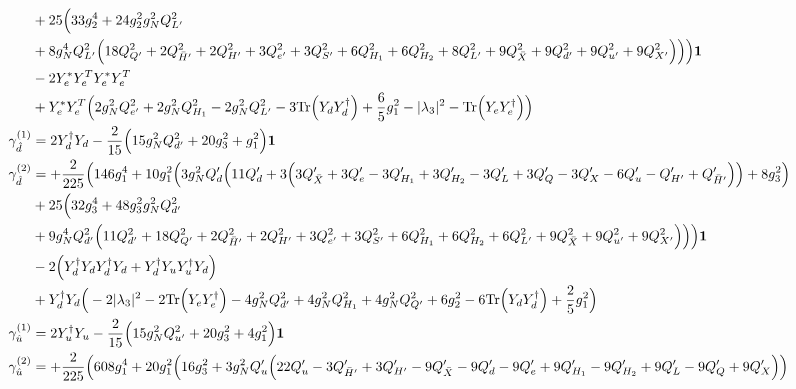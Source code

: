 {\begin{align}
 &+25 \Big(33 g_{2}^{4} +24 g_{2}^{2} g_{N}^{2} Q_{L'}^{2} \nonumber \\ 
 &+8 g_{N}^{4} Q_{L'}^{2} \Big(18 Q_{Q'}^{2}  + 2 Q_{\bar{H}'}^{2}  + 2 Q_{H'}^{2}  + 3 Q_{e'}^{2}  + 3 Q_{S'}^{2}  + 6 Q_{H_1}^{2}  + 6 Q_{H_2}^{2}  + 8 Q_{L'}^{2}  + 9 Q_{\bar{X}}^{2}  + 9 Q_{d'}^{2}  + 9 Q_{u'}^{2}  + 9 Q_{X'}^{2} \Big)\Big)\Big){\bf 1} \nonumber \\ 
 &-2 {Y_e^*  Y_{e}^{T}  Y_e^*  Y_{e}^{T}} \nonumber \\ 
 &+{Y_e^*  Y_{e}^{T}} \Big(2 g_{N}^{2} Q_{e'}^{2}  + 2 g_{N}^{2} Q_{H_1}^{2}  -2 g_{N}^{2} Q_{L'}^{2}  -3 \mbox{Tr}\Big({Y_d  Y_{d}^{\dagger}}\Big)  + \frac{6}{5} g_{1}^{2}  - |\lambda_3|^2  - \mbox{Tr}\Big({Y_e  Y_{e}^{\dagger}}\Big) \Big)\\ 
\gamma_{\hat{d}}^{(1)} & =  
2 {Y_{d}^{\dagger}  Y_d}  -\frac{2}{15} \Big(15 g_{N}^{2} Q_{d'}^{2}  + 20 g_{3}^{2}  + g_{1}^{2}\Big){\bf 1} \\ 
\gamma_{\hat{d}}^{(2)} & =  
+\frac{2}{225} \Big(146 g_{1}^{4} +10 g_{1}^{2} \Big(3 g_{N}^{2} Q_d' \Big(11 Q_d'  + 3 \Big(3 Q_{\bar{X}}'  + 3 Q_e'  -3 Q_{H_1}'  + 3 Q_{H_2}'  -3 Q_L'  + 3 Q_Q'  -3 Q_X'  -6 Q_u'  - Q_{H'}'  + Q_{\bar{H}'}'\Big)\Big) + 8 g_{3}^{2} \Big)\nonumber \\ 
 &+25 \Big(32 g_{3}^{4} +48 g_{3}^{2} g_{N}^{2} Q_{d'}^{2} \nonumber \\ 
 &+9 g_{N}^{4} Q_{d'}^{2} \Big(11 Q_{d'}^{2}  + 18 Q_{Q'}^{2}  + 2 Q_{\bar{H}'}^{2}  + 2 Q_{H'}^{2}  + 3 Q_{e'}^{2}  + 3 Q_{S'}^{2}  + 6 Q_{H_1}^{2}  + 6 Q_{H_2}^{2}  + 6 Q_{L'}^{2}  + 9 Q_{\bar{X}}^{2}  + 9 Q_{u'}^{2}  + 9 Q_{X'}^{2} \Big)\Big)\Big){\bf 1} \nonumber \\ 
 &-2 \Big({Y_{d}^{\dagger}  Y_d  Y_{d}^{\dagger}  Y_d} + {Y_{d}^{\dagger}  Y_u  Y_{u}^{\dagger}  Y_d}\Big)\nonumber \\ 
 &+{Y_{d}^{\dagger}  Y_d} \Big(-2 |\lambda_3|^2  -2 \mbox{Tr}\Big({Y_e  Y_{e}^{\dagger}}\Big)  -4 g_{N}^{2} Q_{d'}^{2}  + 4 g_{N}^{2} Q_{H_1}^{2}  + 4 g_{N}^{2} Q_{Q'}^{2}  + 6 g_{2}^{2}  -6 \mbox{Tr}\Big({Y_d  Y_{d}^{\dagger}}\Big)  + \frac{2}{5} g_{1}^{2} \Big)\\ 
\gamma_{\hat{u}}^{(1)} & =  
2 {Y_{u}^{\dagger}  Y_u}  -\frac{2}{15} \Big(15 g_{N}^{2} Q_{u'}^{2}  + 20 g_{3}^{2}  + 4 g_{1}^{2} \Big){\bf 1} \\ 
\gamma_{\hat{u}}^{(2)} & =  
+\frac{2}{225} \Big(608 g_{1}^{4} +20 g_{1}^{2} \Big(16 g_{3}^{2}  + 3 g_{N}^{2} Q_u' \Big(22 Q_u'  -3 Q_{\bar{H}'}'  + 3 Q_{H'}'  -9 Q_{\bar{X}}'  -9 Q_d'  -9 Q_e'  + 9 Q_{H_1}'  -9 Q_{H_2}'  + 9 Q_L'  -9 Q_Q'  + 9 Q_X' \Big)\Big)\nonumber \\ 

\end{align}}
